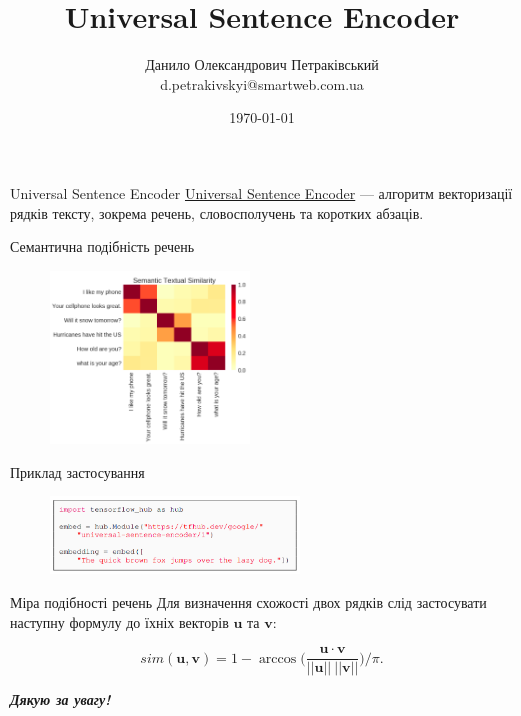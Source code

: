 \documentclass[mathserif]{beamer}
\title{Universal Sentence Encoder}
\institute{prom.ua}
\author[Д.~О.~Петраківський]{Данило Олександрович Петраківський \\ d.petrakivskyi@smartweb.com.ua}
\date{\today}
\begin{document}
    \frame{\titlepage}

    \begin{frame}{Universal Sentence Encoder}
        \href{https://arxiv.org/abs/1803.11175}{Universal Sentence Encoder} --- алгоритм векторизації рядків тексту,
        зокрема речень, словосполучень та коротких абзаців.
    \end{frame}

    \begin{frame}{Семантична подібність речень}
        \begin{figure}[h!]
            \centering
            \includegraphics[width=200px]{images/use-sts}
        \end{figure}
    \end{frame}

    \begin{frame}{Приклад застосування}
        \begin{figure}[h!]
            \centering
            \includegraphics[width=250px]{images/use-code}
        \end{figure}
    \end{frame}

    \begin{frame}{Міра подібності речень}
        Для визначення схожості двох рядків слід застосувати наступну формулу до їхніх векторів $\boldsymbol{u}$ та
        $\boldsymbol{v}$:

        \[
            sim(\boldsymbol{u}, \boldsymbol{v})
            = 1
            - \arccos \biggl(\frac{\boldsymbol{u} \cdot \boldsymbol{v}}{||\boldsymbol{u}|| \ ||\boldsymbol{v}||}\biggr) / \pi.
        \]
    \end{frame}

    \begin{frame}
        \begin{center}
            \Huge \bfseries \itshape Дякую за увагу!
        \end{center}
    \end{frame}
\end{document}
